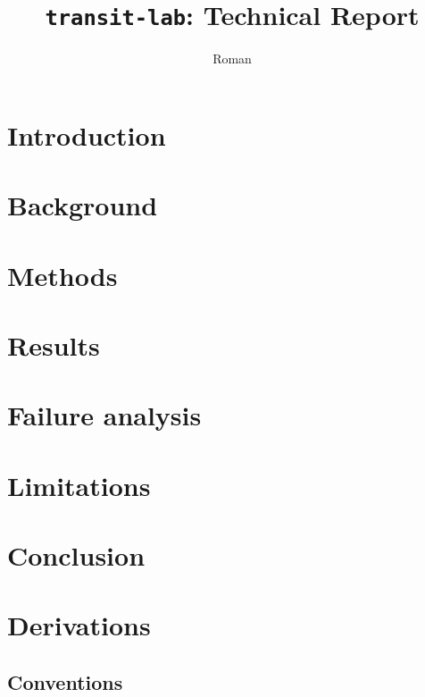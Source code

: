 \documentclass[11pt,a4paper]{article}
\title{\texttt{transit-lab}: Technical Report}
\author{Roman}
\date{}
\begin{document}
\maketitle
\tableofcontents
\newpage

\section{Introduction}
\label{sec:introduction}

\section{Background}
\label{sec:background}

\section{Methods}
\label{sec:methods}

\section{Results}
\label{sec:results}

\section{Failure analysis}
\label{sec:failure-analysis}

\section{Limitations}
\label{sec:limitations}

\section{Conclusion}
\label{sec:conclusion}

\appendix

\section{Derivations}
\label{sec:app-derivations}

\subsection{Conventions}
\label{sec:app-conventions}
\end{document}
